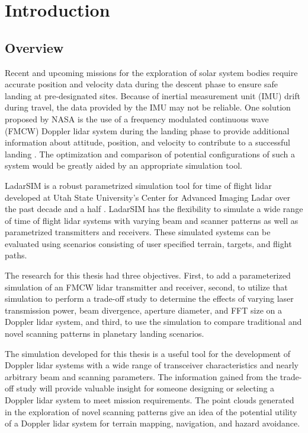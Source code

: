 \chapter{Introduction }
\thispagestyle{empty}
\section{Overview}
Recent and upcoming missions for the exploration of solar system bodies require accurate
position and velocity data during the descent phase to ensure safe landing at pre-designated
sites. Because of inertial measurement unit (IMU) drift during travel, the data provided 
by the IMU may not be reliable. One solution proposed by NASA is the use of a frequency
modulated continuous wave (FMCW) Doppler lidar system during the landing phase to provide
additional information about attitude, position, and velocity to contribute to a successful
landing \cite{amz12,amz12fiber,amz12p2}. The optimization and comparison of potential configurations
of such a system would be greatly aided by an appropriate simulation tool.

LadarSIM is a robust parametrized simulation tool for time of flight lidar
developed at Utah State University's Center
for Advanced Imaging Ladar over the past decade and a half \cite{budgeLeishman,neilsenBudge}.
LadarSIM has the flexibility to simulate a wide range of time of flight
lidar systems with varying beam and scanner patterns as well as parametrized transmitters
and receivers.
These simulated systems can be evaluated using scenarios consisting of
user specified terrain, targets, and flight paths.

The research for this thesis had three objectives. First, to add a parameterized simulation
of an FMCW lidar transmitter and receiver, second, to utilize that simulation to perform
a trade-off study to determine the effects of varying laser transmission power, beam
divergence, aperture diameter, and FFT size on a Doppler lidar system, and third, to use the
simulation to compare traditional and novel scanning patterns in planetary landing 
scenarios. 

The simulation developed for this thesis is a useful tool for the development of Doppler lidar systems
with a wide range of transceiver characteristics and nearly arbitrary beam and 
scanning parameters. The information gained from the trade-off study will provide
valuable insight for someone designing or selecting a Doppler lidar system to meet
mission requirements. The point clouds generated in the exploration of novel scanning 
patterns give an idea of the potential utility of a Doppler lidar system for terrain mapping, navigation,
and hazard avoidance. 

